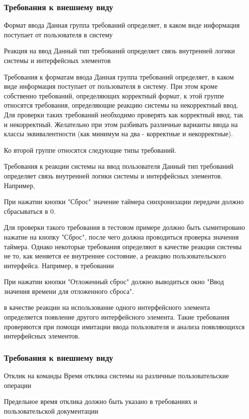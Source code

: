 \documentclass{../industrial-development}
\begin{document}
\begin{frame} \frametitle{Требования к внешнему виду}
  \begin{block}{Формат ввода}
  Данная группа требований определяет, в каком виде информация поступает от пользователя в систему
  \end{block}
  \begin{block}{Реакция на ввод}
   Данный тип требований определяет связь внутренней логики системы и интерфейсных элементов
  \end{block}
\end{frame}

\lecturenotes

Требования к форматам ввода
Данная группа требований определяет, в каком виде информация поступает от пользователя в систему. При этом кроме собственно требований, определяющих корректный формат, к этой группе относятся требования, определяющие реакцию системы на некорректный ввод. Для проверки таких требований необходимо проверять как корректный ввод, так и некорректный. Желательно при этом разбивать различные варианты ввода на классы эквивалентности (как минимум на два - корректные и некорректные).

Ко второй группе относятся следующие типы требований.

Требования к реакции системы на ввод пользователя
Данный тип требований определяет связь внутренней логики системы и интерфейсных элементов. Например,

При нажатии кнопки "Сброс" значение таймера синхронизации передачи должно сбрасываться в 0.

Для проверки такого требования в тестовом примере должно быть сымитировано нажатие на кнопку "Сброс", после чего должна проводиться проверка значения таймера. Однако некоторые требования определяют в качестве реакции системы не то, как меняется ее внутреннее состояние, а реакцию пользовательского интерфейса. Например, в требовании

При нажатии кнопки "Отложенный сброс" должно выводиться окно "Ввод значения времени для отложенного сброса".

в качестве реакции на использование одного интерфейсного элемента определяется появление другого интерфейсного элемента. Такие требования проверяются при помощи имитации ввода пользователя и анализа появляющихся интерфейсных элементов.

\begin{frame} \frametitle{Требования к внешнему виду}
  \begin{block}{Отклик на команды}
  Время отклика системы на различные пользовательские операции
  \end{block}
Предельное время отклика должно быть указано в требованиях и пользовательской документации
\end{frame}
\end{document}
